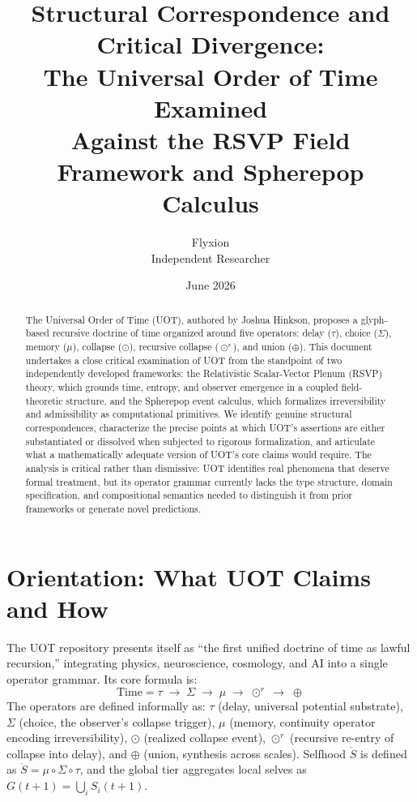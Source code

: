 \documentclass[12pt, oneside]{article}
\title{\textbf{Structural Correspondence and Critical Divergence:\\
The Universal Order of Time Examined\\
Against the RSVP Field Framework and Spherepop Calculus}}
\author{Flyxion \\ Independent Researcher}
\date{June 2026}
\theoremstyle{plain-remark}
\newcommand{\utau}{\tau}
\newcommand{\uSigma}{\Sigma}
\newcommand{\umu}{\mu}
\newcommand{\ucollapse}{\odot}
\newcommand{\urcollapse}{\odot^r}
\newcommand{\uunion}{\oplus}
\newcommand{\uS}{\mathring{S}}
\begin{document}
\maketitle

\begin{abstract}
The Universal Order of Time (UOT), authored by Joshua Hinkson, proposes a
glyph-based recursive doctrine of time organized around five operators: delay
($\utau$), choice ($\uSigma$), memory ($\umu$), collapse ($\ucollapse$), recursive
collapse ($\urcollapse$), and union ($\uunion$). This document undertakes a close
critical examination of UOT from the standpoint of two independently developed
frameworks: the Relativistic Scalar-Vector Plenum (RSVP) theory, which grounds time,
entropy, and observer emergence in a coupled field-theoretic structure, and the
Spherepop event calculus, which formalizes irreversibility and admissibility as
computational primitives. We identify genuine structural correspondences, characterize
the precise points at which UOT's assertions are either substantiated or dissolved when
subjected to rigorous formalization, and articulate what a mathematically adequate
version of UOT's core claims would require. The analysis is critical rather than
dismissive: UOT identifies real phenomena that deserve formal treatment, but its
operator grammar currently lacks the type structure, domain specification, and
compositional semantics needed to distinguish it from prior frameworks or generate
novel predictions.
\end{abstract}

\tableofcontents
\newpage


\section{Orientation: What UOT Claims and How}

The UOT repository presents itself as ``the first unified doctrine of time as lawful
recursion,'' integrating physics, neuroscience, cosmology, and AI into a single operator
grammar. Its core formula is:
\[
\text{Time} = \utau \;\to\; \uSigma \;\to\; \umu \;\to\; \urcollapse \;\to\; \uunion
\]
The operators are defined informally as: $\utau$ (delay, universal potential substrate),
$\uSigma$ (choice, the observer's collapse trigger), $\umu$ (memory, continuity operator
encoding irreversibility), $\ucollapse$ (realized collapse event), $\urcollapse$ (recursive
re-entry of collapse into delay), and $\uunion$ (union, synthesis across scales). Selfhood
$\uS$ is defined as $\uS = \umu \circ \uSigma \circ \utau$, and the global tier aggregates
local selves as $G(t+1) = \bigcup_i S_i(t+1)$.
\end{document}
